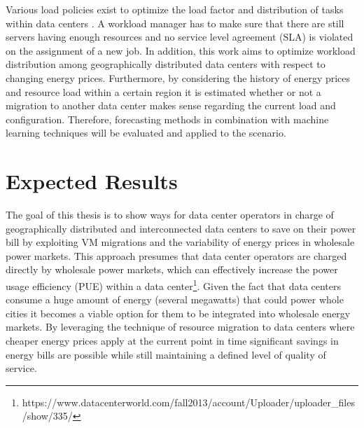 \documentclass[a4paper]{article}
\begin{document}
Various load policies exist to optimize the load factor and distribution of tasks within data centers \cite{buyya2010energy}. A workload manager has to make sure that there are still servers having enough resources and no service level agreement (SLA) is violated on the assignment of a new job. 
In addition, this work aims to optimize workload distribution among geographically distributed data centers with respect to changing energy prices. 
Furthermore, by considering the history of energy prices and resource load within a certain region it is estimated whether or not a migration to another data center makes sense regarding the current load and configuration. Therefore, forecasting methods in combination with machine learning techniques will be evaluated and applied to the scenario. 




\section{Expected Results}

The goal of this thesis is to show ways for data center operators in charge of geographically distributed and interconnected data centers to save on their power bill by exploiting VM migrations and the variability of energy prices in wholesale power markets. This approach presumes that data center operators are charged directly by wholesale power markets, which can effectively increase the power usage efficiency (PUE) within a data center\footnote{https://www.datacenterworld.com/fall2013/account/Uploader/uploader\_files/show/335/}. Given the fact that data centers consume a huge amount of energy (several megawatts)\cite{qureshi2009cutting} that could power whole cities it becomes a viable option for them to be integrated into wholesale energy markets. By leveraging the technique of resource migration to data centers where cheaper energy prices apply at the current point in time significant savings in energy bills are possible while still maintaining a defined level of quality of service. 
\end{document}
